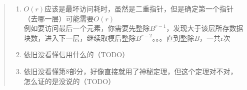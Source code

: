 \documentclass[11pt,a4paper]{article}
\begin{document}
\begin{quote}
\begin{enumerate}
        N:有效数据占用\\
        2(r−1):指向每一层的索引块的指针占用\\
        2(r−1)B:每一层的索引块占用\\
        B-1:冗余未使用的数据块大小\\
        \item $O(r)$应该是最坏访问耗时，虽然是二重指针，但是确定第一个指针（去哪一层）可能需要$O(r)$\\
        例如要访问最后一个元素，你需要先整除$B^{r-1}$，发现大于该层所存数据块数，进入下一层，继续取模后整除$B^{r-2}$。。。直到整除$B$，一共r次
        \item 依旧没看懂信用什么的（TODO）
        \item 依旧没看懂第8部分，好像直接就用了神秘定理，但这个定理对不对，怎么证的是没说的（TODO）
    \end{enumerate}
\end{quote}
\end{document}
